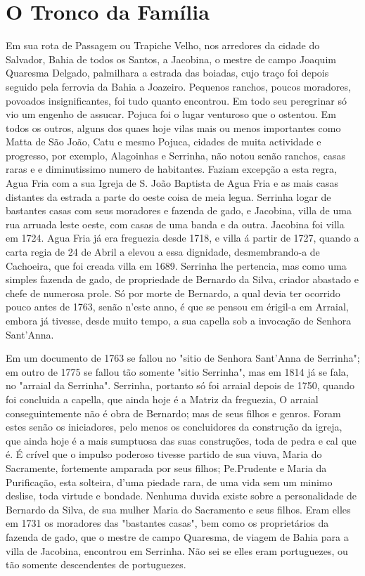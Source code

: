 \chapter{O Tronco da Família}

Em sua rota de Passagem ou Trapiche Velho, nos arredores da cidade do Salvador, Bahia de todos os Santos, a Jacobina, o mestre  de campo Joaquim Quaresma Delgado, palmilhara a estrada das boiadas, cujo traço foi depois seguido pela ferrovia da Bahia a Joazeiro. Pequenos ranchos, poucos moradores, povoados insignificantes, foi tudo quanto encontrou. Em todo seu peregrinar só vio um engenho de assucar. Pojuca foi o lugar venturoso que o ostentou. Em todos os outros, alguns dos quaes hoje vilas mais ou menos importantes como Matta de São João, Catu e mesmo Pojuca, cidades de muita actividade e progresso, por exemplo, Alagoinhas e Serrinha, não notou senão ranchos, casas raras e e diminutissimo numero de habitantes. Faziam excepção a esta regra, Agua Fria com a sua Igreja de S. João Baptista de Agua Fria e as mais casas distantes da estrada a parte do oeste coisa de meia legua. Serrinha logar de bastantes casas com seus moradores e fazenda de gado, e Jacobina, villa de uma rua arruada leste oeste, com casas de uma banda e da outra.  Jacobina foi villa em 1724. Agua Fria já era freguezia desde 1718, e villa á partir de 1727, quando a carta regia de 24 de Abril a elevou a essa dignidade, desmembrando-a de Cachoeira, que foi creada villa em 1689. Serrinha lhe pertencia, mas como uma simples fazenda de gado, de propriedade de Bernardo da Silva, criador abastado e chefe de numerosa prole. Só por morte de Bernardo, a qual devia ter ocorrido pouco antes de 1763, senão n'este anno, é que se pensou em érigil-a em Arraial, embora já tivesse, desde muito tempo, a sua capella sob a invocação de Senhora Sant'Anna.

Em um documento de 1763 se fallou no "sitio de Senhora Sant'Anna de Serrinha"; em outro de 1775 se fallou tão somente "sitio Serrinha", mas em 1814 já se fala, no "arraial da Serrinha". Serrinha, portanto só foi arraial depois de 1750, quando foi concluida a capella, que ainda hoje é a Matriz da freguezia, O arraial conseguintemente não é obra de Bernardo; mas de seus filhos e genros. Foram estes senão os iniciadores, pelo menos os concluidores da construção da igreja, que ainda hoje é a mais sumptuosa das suas construções, toda de pedra e cal que é. É crível que o impulso poderoso tivesse partido de sua viuva, Maria do Sacramente, fortemente amparada por seus filhos; Pe.Prudente e Maria da Purificação, esta solteira, d'uma piedade rara, de uma vida sem um  minimo deslise, toda virtude e bondade. Nenhuma duvida existe sobre a personalidade de Bernardo da Silva, de sua mulher Maria do Sacramento e seus filhos. Eram elles em 1731 os moradores das "bastantes casas", bem como os proprietários da fazenda de gado, que o mestre de campo Quaresma, de viagem de Bahia para a villa de Jacobina, encontrou em Serrinha. Não sei se elles eram portuguezes, ou tão somente descendentes de portuguezes.

